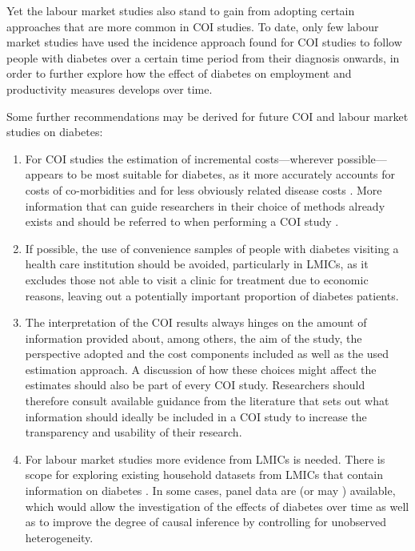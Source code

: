 Yet the labour market studies also stand to gain from adopting certain approaches that are more common in \ac{COI} studies. To date, only few labour market studies have used the incidence approach found for \ac{COI} studies to follow people with diabetes over a certain time period from their diagnosis onwards, in order to further explore how the effect of diabetes on employment and productivity measures develops over time.

Some further recommendations may be derived for future \ac{COI} and labour market studies on diabetes: 
\begin{enumerate}


\item	For \ac{COI} studies the estimation of incremental costs---wherever possible---appears to be most suitable for diabetes, as it more accurately accounts for costs of co-morbidities  and for less obviously related disease costs \parencite{Honeycutt2009a,Tunceli2010c}. More information that can guide researchers in their choice of methods already exists and should be referred to when performing a \ac{COI} study \parencite{Akobundu2006}.

\item	If possible, the use of convenience samples of people with diabetes visiting a health care institution should be avoided, particularly in \acp{LMIC}, as it excludes those not able \DIFdelbegin {}\DIFdelend to visit a clinic for treatment due to economic reasons, leaving out a potentially important proportion of diabetes patients.

\item	The interpretation of the \ac{COI} results always hinges on the amount of information provided about, among others, the aim of the study, the perspective adopted and the cost components included as well as the used estimation approach. A discussion of how these choices might affect the estimates should also be part of every \ac{COI} study. Researchers should therefore consult available guidance from the literature that sets out what information should ideally be included in a \ac{COI} study \parencite{Larg2011} to increase the transparency and usability of their research. 

\item	For labour market studies more evidence from \acp{LMIC} is needed. There is scope for exploring existing household datasets from \acp{LMIC} that contain information on diabetes \parencite{Seuring2014}. In some cases, panel data are (or may \DIFdelbegin {}\DIFdelend \DIFaddbegin {}\DIFaddend ) available, which would allow the investigation of the effects of diabetes over time as well as to improve the degree of causal inference by controlling for unobserved heterogeneity.


\end{enumerate}

